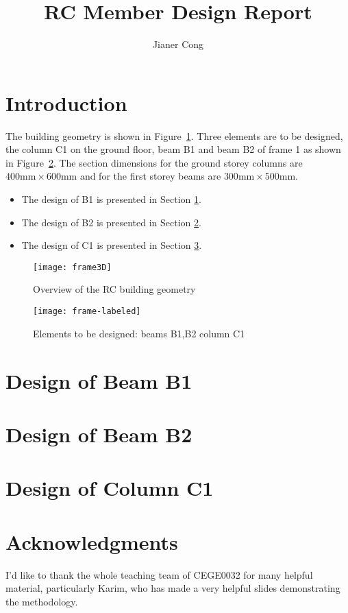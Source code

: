 \documentclass[fleqn,10pt]{olplainarticle}
\title{RC Member Design Report}
\author[1]{Jianer Cong}
\affil[1]{zcesjco@ucl.ac.uk}
\begin{document}
\maketitle

\section*{Introduction}
The building geometry is shown in Figure~\ref{fig:fr3d}. Three elements are to
be designed, the column C1 on the ground floor, beam B1 and beam B2 of frame 1
as shown in Figure~\ref{fig:frl}. The section dimensions for the ground storey
columns are $400 \mbox{mm} \times 600 \mbox{mm}$ and for the first storey beams
are  $300 \mbox{mm} \times 500 \mbox{mm}$.
\begin{itemize}
\item The design of B1 is presented in Section \ref{sec:bm}.
\item The design of B2 is presented in Section \ref{sec:bm2}.
\item The design of C1 is presented in Section \ref{sec:col}.
\end{itemize}

\begin{figure}
  \centering
  \texttt{[image: frame3D]}
  \caption{Overview of the RC building geometry}\label{fig:fr3d}
\end{figure}

\begin{figure}
  \centering
  \texttt{[image: frame-labeled]}
  \caption{Elements to be designed: beams B1,B2 column C1}\label{fig:frl}
\end{figure}

\section{Design of Beam B1}\label{sec:bm}
\newcommand{\g}[1]{\MyGet{#1}}


\section{Design of Beam B2}\label{sec:bm2}
\renewcommand{\g}[1]{\MyGet{b2.#1}}


\section{Design of Column C1}\label{sec:col}


\section*{Acknowledgments}

I'd like to thank the whole teaching team of CEGE0032 for many helpful material,
particularly Karim, who has made a very helpful slides demonstrating the
methodology.
% 
\end{document}
